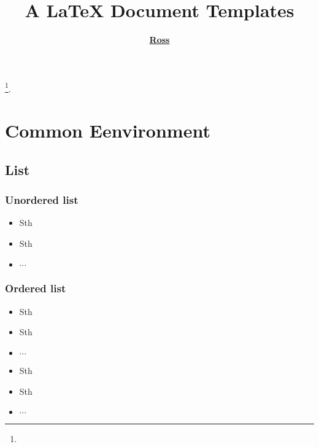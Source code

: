 \documentclass[a4paper, 12pt]{article}
\begin{document}
\title{\bf {A \LaTeX{} Document Templates}} \author{\bf
  \href{https://www.hustmatnoble.tk/2019/11/contact-me.html}{Ross}}
\date{}

\pagestyle{fancy}  \fancyhead[R]{\textcolor{PrimaryColor}{Ross}}

\maketitle
\tableofcontents
\footnote{\noindent {} \newline
  \updatetext{\today}}.

\clearpage
\listoflistings

\clearpage

\section{Common Eenvironment}

\subsection{List}

\subsubsection{Unordered list}
\begin{itemize}
    \item Sth
    \item Sth
    \item $\cdots$
\end{itemize}
\subsubsection{Ordered list}
\begin{itemize}
    \item[(1)] Sth
    \item[(2)] Sth
    \item[(3)] $\cdots$
\end{itemize}
\begin{mybox}{12}
    \begin{itemize}[leftmargin = 10pt]
        \item Sth
        \item Sth
        \item $\cdots$
    \end{itemize}
\end{mybox}
\end{document}
